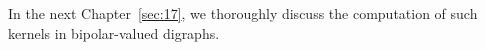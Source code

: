 In the next Chapter~\ref{sec:17}, we thoroughly discuss the computation of such kernels in bipolar-valued digraphs.

\clearpage
%


